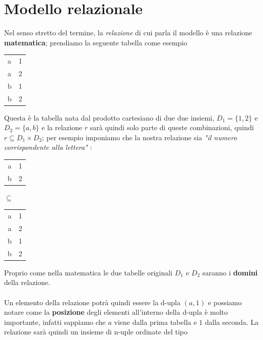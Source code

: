 \section{Modello relazionale}
Nel senso stretto del termine, la \textit{relazione} di cui 
parla il modello è una relazione \textbf{matematica}; prendiamo 
la seguente tabella come esempio

\begin{center}
  \begin{tabular}{|l|r|}
    \hline
    a & 1 \\
    a & 2 \\
    b & 1 \\
    b & 2 \\
    \hline
  \end{tabular}
\end{center}

Questa è la tabella nata dal prodotto cartesiano di due 
due insiemi, \(D_1 = \{1, 2\} \) e \(D_2 = \{a, b\} \) e 
la relazione \(r\) sarà quindi solo parte di queste combinazioni,
quindi \( r \subseteq D_1 \times D_2\); per esempio
imponiamo che la nostra relazione sia 
\textit{"il numero corrispondente alla lettera"} : 

\begin{center}
    \begin{minipage}{0.3\textwidth}
        \centering
        \begin{tabular}{|c|c|}
            \hline
            a & 1 \\
            b & 2 \\
            \hline
        \end{tabular}
    \end{minipage}
    $\subseteq$ %
    \begin{minipage}{0.3\textwidth}
        \centering
        \begin{tabular}{|c|c|}
            \hline
            a & 1 \\
            a & 2 \\
            b & 1 \\
            b & 2 \\
            \hline
        \end{tabular}
    \end{minipage}
\end{center}

Proprio come nella matematica le due tabelle originali \(D_1\) e 
\(D_2\) saranno i \textbf{domini} della relazione.
\\
\\
Un elemento della relazione potrà quindi essere la d-upla 
\( (a, 1) \) e possiamo notare come la \textbf{posizione} degli elementi
all'interno della d-upla è molto importante, infatti sappiamo che
\(a\) viene dalla prima tabella e \(1\) dalla seconda.
La relazione sarà quindi un insieme di n-uple ordinate del tipo

